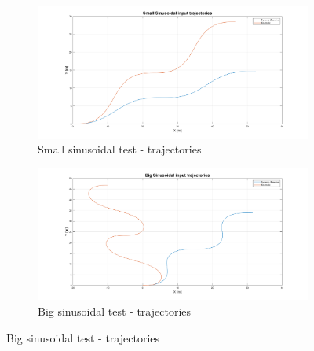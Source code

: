 \begin{figure}[H]
    \begin{subfigure}{.5\textwidth}
    \centering
   \includegraphics[width=1.1\textwidth,keepaspectratio]{Figures/Small_sin_traj.png}
   \caption{Small sinusoidal test - trajectories}
   \label{subfig:small_sinusoidal}
    \end{subfigure}%
    \begin{subfigure}{.5\textwidth}
    \centering
    \includegraphics[width=1.1\textwidth,keepaspectratio]{Figures/Big_sin_traj.png}
    \caption{Big sinusoidal test - trajectories}
    \label{subfig:big_sinusoidal}
    \end{subfigure}
    
     \vspace{10mm}
    

\end{figure}
